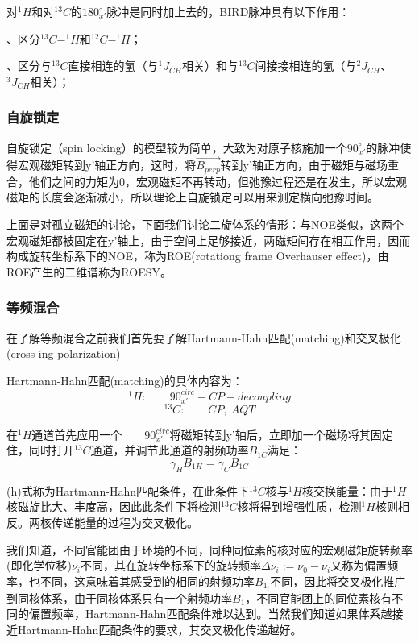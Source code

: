 对$^1H$和对$^{13}C$的$180^{\circ}_{x'}$脉冲是同时加上去的，BIRD脉冲具有以下作用：

、区分$^{13}C-^1H$和$^{12}C-^1H$；

、区分与$^{13}C$直接相连的氢（与$^1J_{CH}$相关）和与$^{13}C$间接接相连的氢（与$^2J_{CH}$、$^3J_{CH}$相关）；

\subsubsection{自旋锁定} 

自旋锁定（spin locking）的模型较为简单，大致为对原子核施加一个$90^{\circ}_{x'}$的脉冲使得宏观磁矩转到y'轴正方向，这时，将$\overrightarrow{B_{perp}}$转到y'轴正方向，由于磁矩与磁场重合，他们之间的力矩为0，宏观磁矩不再转动，但弛豫过程还是在发生，所以宏观磁矩的长度会逐渐减小，所以理论上自旋锁定可以用来测定横向弛豫时间。

上面是对孤立磁矩的讨论，下面我们讨论二旋体系的情形：与NOE类似，这两个宏观磁矩都被固定在y'轴上，由于空间上足够接近，两磁矩间存在相互作用，因而构成旋转坐标系下的NOE，称为ROE(rotationg frame Overhauser effect)，由ROE产生的二维谱称为ROESY。

\subsubsection{等频混合}

在了解等频混合之前我们首先要了解Hartmann-Hahn匹配(matching)和交叉极化(cross
ing-polarization)

Hartmann-Hahn匹配(matching)的具体内容为：
\[^1H: \qquad 90^{circ}_{x'}-CP-decoupling\]
\[^{13}C: \qquad CP, \ AQT\]

在$^1H$通道首先应用一个$\qquad 90^{circ}_{x'}$将磁矩转到y'轴后，立即加一个磁场将其固定住，同时打开$^{13}C$通道，并调节此通道的射频功率$B_{1C}$满足：
\[\gamma_H B_{1H}=\gamma_C B_{1C} \tag{h}\]

(h)式称为Hartmann-Hahn匹配条件，在此条件下$^{13}C$核与$^1H$核交换能量：由于$^1H$核磁旋比大、丰度高，因此此条件下将检测$^{13}C$核将得到增强性质，检测$^{1}H$核则相反。两核传递能量的过程为交叉极化。

我们知道，不同官能团由于环境的不同，同种同位素的核对应的宏观磁矩旋转频率(即化学位移)$\nu_i$不同，其在旋转坐标系下的旋转频率$\Delta \nu_i:=\nu_0-\nu_i$又称为偏置频率，也不同，这意味着其感受到的相同的射频功率$B_{1_i}$不同，因此将交叉极化推广到同核体系，由于同核体系只有一个射频功率$B_{1}$，不同官能团上的同位素核有不同的偏置频率，Hartmann-Hahn匹配条件难以达到。当然我们知道如果体系越接近Hartmann-Hahn匹配条件的要求，其交叉极化传递越好。

